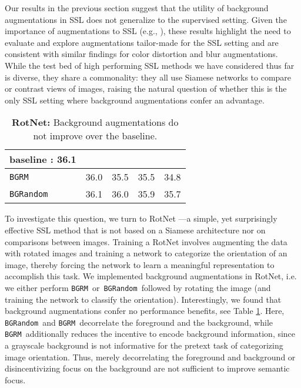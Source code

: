 \documentclass[twoside,11pt]{article}
\newcommand{\bgrm}{\texttt{BG\textunderscore RM}}
\newcommand{\bgrand}{\texttt{BG\textunderscore Random}}
\begin{document}
Our results in the previous section suggest that the utility of background augmentations in SSL does not generalize to the supervised setting. Given the importance of augmentations to SSL (e.g., \citet{chen2020simple}), these results highlight the need to evaluate and explore augmentations tailor-made for the SSL setting and are consistent with
similar findings \citep{chen2020simple} for color distortion and blur augmentations. While the test bed of high performing SSL methods we have considered thus far is diverse, they share a commonality: they all use Siamese networks to compare or contrast views of images, raising the natural question of whether this is the only SSL setting where background augmentations confer an advantage.  

\begin{table}
    \centering
    \begin{tabular}{l|cccc}\toprule
        baseline : 36.1 &  &  &  & \\\midrule
        \bgrm  & 36.0 & 35.5 & 35.5 & 34.8 \\
        \bgrand & 36.1 & 36.0 & 35.9 & 35.7 \\\bottomrule
    \end{tabular}
    \caption{\textbf{RotNet:} Background augmentations do not improve over the baseline.}
    \label{tab:rotnet}
\end{table}

To investigate this question, we turn to RotNet \citep{gidaris2018unsupervised}---a simple, yet surprisingly effective SSL method that is not based on a Siamese architecture nor on comparisons between images. Training a RotNet involves augmenting the data with rotated images and training a network to categorize the orientation of an image, thereby forcing the network to learn a meaningful representation to accomplish this task. We implemented background augmentations in RotNet, i.e. we either perform \bgrm~or~\bgrand~followed by rotating the image (and training the network to classify the orientation). Interestingly, we found that background augmentations confer no performance benefits, see Table \ref{tab:rotnet}. Here, \bgrand~and \bgrm~decorrelate the foreground and the background, while \bgrm~additionally reduces the incentive to encode background information, since a grayscale background is not informative for the pretext task of categorizing image orientation. Thus, merely decorrelating the foreground and background or disincentivizing focus on the background are not sufficient to improve semantic focus.
\end{document}
